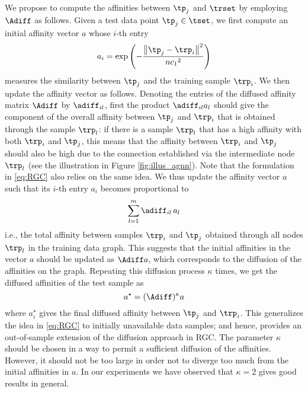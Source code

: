 \documentclass[journal]{IEEEtran}
\begin{document}
We propose to compute the affinities between $\tp_j$ and $\trset$ by employing $\Adiff$ as follows. Given a test data point $\tp_j \in \tset$, we first compute an initial affinity vector $a$ whose $i$-th entry
\begin{equation}
\label{eq:aff_init_test}
a_i=\exp\left(-\frac{\left\| \tp_j -\trp_i \right\|^2}{n{c_1}^2}\right)
\end{equation}
measures the similarity between $\tp_j$ and the training sample $\trp_i$. We then update the affinity vector as follows. Denoting the entries of the diffused affinity matrix $\Adiff$ by $\adiff_{il}$, first the product $\adiff_{il} a_l$ should give the component of the overall affinity between $\tp_j$ and $\trp_i$ that is obtained through the sample $\trp_l$: if there is a sample $\trp_l$ that has a high affinity with both $\trp_i$ and $\tp_j$, this means that the affinity between $\trp_i$ and $\tp_j$ should also be high due to the connection established via the intermediate node $\trp_l$ (see the illustration in Figure \ref{fig:illus_agnn}). Note that the formulation in \eqref{eq:RGC} also relies on the same idea. We thus update the affinity vector $a$ such that its $i$-th entry $a_i$ becomes proportional to
\begin{equation}
\label{eq:agnn_oos_singlep}
\sum_{l=1}^m \adiff_{il} \, a_l
\end{equation}
i.e., the total affinity between samples $\trp_i$ and $\tp_j$ obtained through all nodes $\trp_l$ in the training data graph. This suggests that the initial affinities in the vector $a$ should be updated as $\Adiff a$, which corresponds to the diffusion of the affinities on the graph. Repeating this diffusion process $\kappa$ times, we get the diffused affinities of the test sample as
\begin{equation}
\label{eq:diff_aff_test}
a^{\star}=(\Adiff) ^{\kappa}a
\end{equation}
where $a^{\star}_i$ gives the final diffused affinity between $\tp_j$ and $\trp_i$. This generalizes the idea in \eqref{eq:RGC} to initially unavailable data samples; and hence, provides an out-of-sample extension of the diffusion approach in RGC. The parameter $\kappa$ should be chosen in a way to permit a sufficient diffusion of the affinities. However, it should not be too large in order not to diverge too much from the initial affinities in $a$. In our experiments we have observed that $\kappa=2$ gives good results in general.
\end{document}
